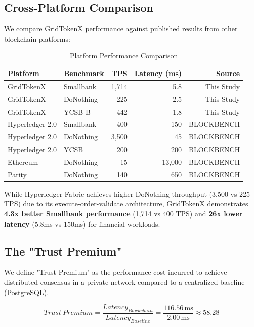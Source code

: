 \documentclass[conference]{IEEEtran}
\begin{document}
{\subsection{Cross-Platform Comparison}
We compare GridTokenX performance against published results from other blockchain platforms:

\begin{table}[htbp]
\caption{Platform Performance Comparison}
\begin{center}
\begin{tabular}{llrrr}
\toprule
\textbf{Platform} & \textbf{Benchmark} & \textbf{TPS} & \textbf{Latency (ms)} & \textbf{Source} \\
\midrule
GridTokenX & Smallbank & 1,714 & 5.8 & This Study \\
GridTokenX & DoNothing & 225 & 2.5 & This Study \\
GridTokenX & YCSB-B & 442 & 1.8 & This Study \\
\midrule
Hyperledger 2.0 & Smallbank & 400 & 150 & BLOCKBENCH \\
Hyperledger 2.0 & DoNothing & 3,500 & 45 & BLOCKBENCH \\
Hyperledger 2.0 & YCSB & 200 & 200 & BLOCKBENCH \\
\midrule
Ethereum & DoNothing & 15 & 13,000 & BLOCKBENCH \\
Parity & DoNothing & 140 & 650 & BLOCKBENCH \\
\bottomrule
\end{tabular}
\label{tab:comparison}
\end{center}
\end{table}

While Hyperledger Fabric achieves higher DoNothing throughput (3,500 vs 225 TPS) due to its execute-order-validate architecture, GridTokenX demonstrates \textbf{4.3x better Smallbank performance} (1,714 vs 400 TPS) and \textbf{26x lower latency} (5.8ms vs 150ms) for financial workloads.

\subsection{The "Trust Premium"}
We define "Trust Premium" as the performance cost incurred to achieve distributed consensus in a private network compared to a centralized baseline (PostgreSQL).

\begin{equation}
Trust\ Premium = \frac{Latency_{Blockchain}}{Latency_{Baseline}} = \frac{116.56\,\text{ms}}{2.00\,\text{ms}} \approx 58.28
\label{eq:trust-premium}
\end{equation}

}
\end{document}
